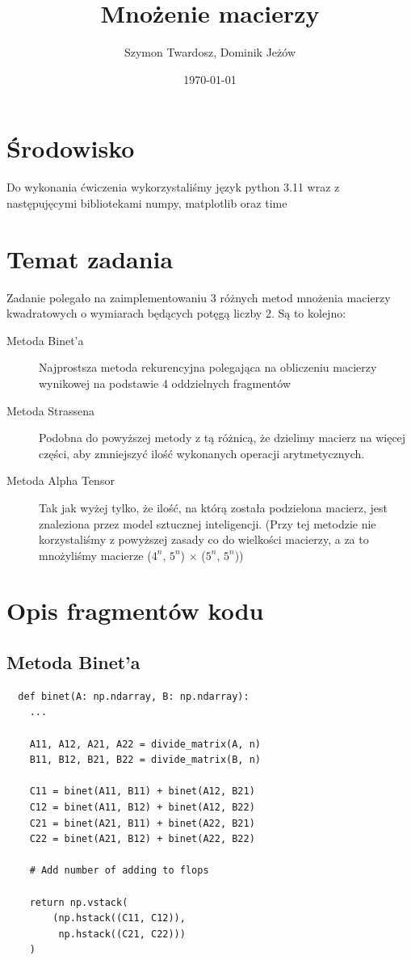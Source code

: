 \documentclass{article}
\title{Mnożenie macierzy}
\author{Szymon Twardosz, Dominik Jeżów}
\date{\today}
\begin{document}
\maketitle

\section{\'Srodowisko}
Do wykonania \'cwiczenia wykorzystali\'smy język
python 3.11 wraz z nast\k{e}puj\k{e}cymi bibliotekami
numpy, matplotlib oraz time

\section{Temat zadania}
Zadanie polegało na zaimplementowaniu 3 różnych metod mnożenia macierzy kwadratowych o wymiarach
będących potęgą liczby 2. Są to kolejno:
\begin{description}
\item[Metoda Binet'a] Najprostsza metoda rekurencyjna polegająca na obliczeniu
macierzy wynikowej na podstawie 4 oddzielnych fragmentów
\item[Metoda Strassena] Podobna do powyższej metody z tą różnicą, że dzielimy
macierz na więcej części, aby zmniejszyć ilość wykonanych operacji arytmetycznych.
\item[Metoda Alpha Tensor] Tak jak wyżej tylko, że ilość, na którą została
podzielona macierz, jest znaleziona przez model sztucznej inteligencji.
(Przy tej metodzie nie korzystaliśmy z powyższej zasady co do wielkości macierzy,
a za to mnożyliśmy macierze ($4^n$, $5^n$) $\times$ ($5^n$, $5^n$))
\end{description}

\section{Opis fragmentów kodu}
\subsection{Metoda Binet'a}
\begin{lstlisting}
  def binet(A: np.ndarray, B: np.ndarray):
    ...

    A11, A12, A21, A22 = divide_matrix(A, n)
    B11, B12, B21, B22 = divide_matrix(B, n)

    C11 = binet(A11, B11) + binet(A12, B21)
    C12 = binet(A11, B12) + binet(A12, B22)
    C21 = binet(A21, B11) + binet(A22, B21)
    C22 = binet(A21, B12) + binet(A22, B22)

    # Add number of adding to flops

    return np.vstack(
        (np.hstack((C11, C12)),
         np.hstack((C21, C22)))
    )
    
\end{lstlisting}
\end{document}
